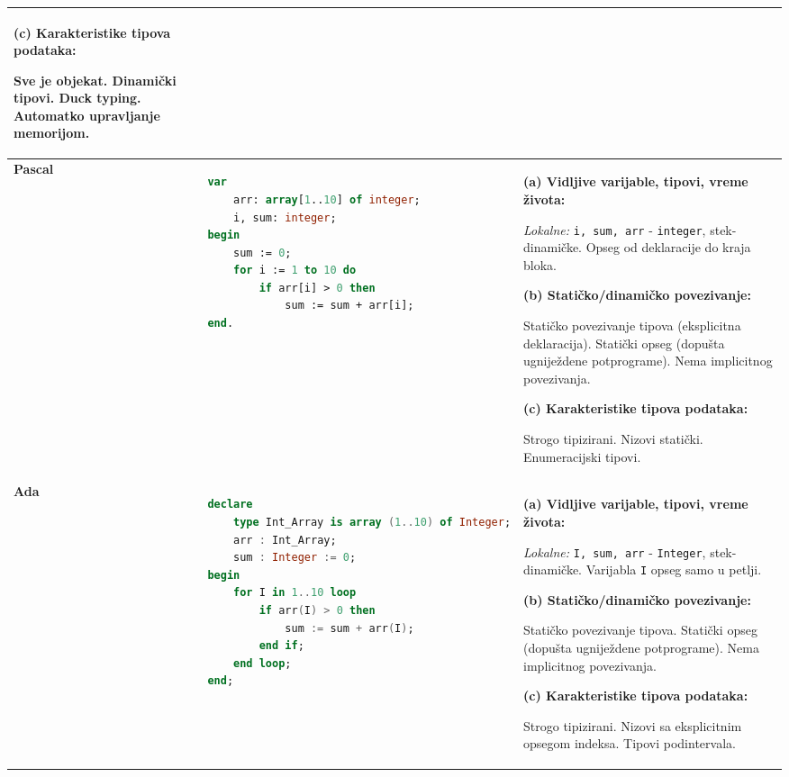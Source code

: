 \documentclass[12pt,a4paper]{article}
\begin{document}
\begin{longtable}{|p{2cm}|p{5cm}|p{8cm}|}
\vspace{0.2cm}
\textbf{(c) Karakteristike tipova podataka:}

Sve je objekat. Dinamički tipovi. Duck typing. Automatko upravljanje memorijom. \\
\hline

\textbf{Pascal} & 
\begin{lstlisting}[language=Pascal]
var
    arr: array[1..10] of integer;
    i, sum: integer;
begin
    sum := 0;
    for i := 1 to 10 do
        if arr[i] > 0 then
            sum := sum + arr[i];
end.
\end{lstlisting} & 
\textbf{(a) Vidljive varijable, tipovi, vreme života:}

\textit{Lokalne:} \texttt{i, sum, arr} - \texttt{integer}, stek-dinamičke. Opseg od deklaracije do kraja bloka.

\vspace{0.2cm}
\textbf{(b) Statičko/dinamičko povezivanje:}

Statičko povezivanje tipova (eksplicitna deklaracija). Statički opseg (dopušta ugniježdene potprograme). Nema implicitnog povezivanja.

\vspace{0.2cm}
\textbf{(c) Karakteristike tipova podataka:}

Strogo tipizirani. Nizovi statički. Enumeracijski tipovi. \\
\hline

\textbf{Ada} & 
\begin{lstlisting}[language=Ada]
declare
    type Int_Array is array (1..10) of Integer;
    arr : Int_Array;
    sum : Integer := 0;
begin
    for I in 1..10 loop
        if arr(I) > 0 then
            sum := sum + arr(I);
        end if;
    end loop;
end;
\end{lstlisting} & 
\textbf{(a) Vidljive varijable, tipovi, vreme života:}

\textit{Lokalne:} \texttt{I, sum, arr} - \texttt{Integer}, stek-dinamičke. Varijabla \texttt{I} opseg samo u petlji.

\vspace{0.2cm}
\textbf{(b) Statičko/dinamičko povezivanje:}

Statičko povezivanje tipova. Statički opseg (dopušta ugniježdene potprograme). Nema implicitnog povezivanja.

\vspace{0.2cm}
\textbf{(c) Karakteristike tipova podataka:}

Strogo tipizirani. Nizovi sa eksplicitnim opsegom indeksa. Tipovi podintervala. \\
\hline


\end{longtable}
\end{document}
